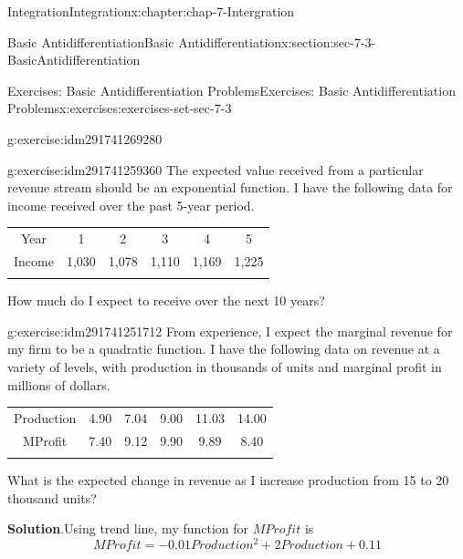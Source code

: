 \documentclass[oneside,10pt,]{book}
\newcommand{\tabularfont}{\relax}
\numberwithin{equation}{section}
\newcommand{\hrulethin}  {\noalign{\hrule height 0.04em}}
\newcommand{\hrulemedium}{\noalign{\hrule height 0.07em}}
\newcommand{\hrulethick} {\noalign{\hrule height 0.11em}}
\begin{document}
\begin{chapterptx}{Integration}{}{Integration}{}{}{x:chapter:chap-7-Intergration}
\begin{sectionptx}{Basic Antidifferentiation}{}{Basic Antidifferentiation}{}{}{x:section:sec-7-3-BasicAntidifferentiation}
\begin{exercises-subsection}{Exercises: Basic Antidifferentiation Problems}{}{Exercises: Basic Antidifferentiation Problems}{}{}{x:exercises:exercises-set-sec-7-3}
\begin{divisionexercise}{21}{}{}{g:exercise:idm291741269280}
\begin{enumerate}[label=(\alph*)]
\end{enumerate}
\end{divisionexercise}%
\begin{divisionexercise}{22}{}{}{g:exercise:idm291741259360}%
The expected value received from a particular revenue stream should be an exponential function.  I have the following data for income received over the past 5-year period.%
\begin{sidebyside}{1}{0}{0}{0}%
\begin{sbspanel}{1}%
{\centering%
{\tabularfont%
\begin{tabular}{cccccc}\hrulethick
Year&1&2&3&4&5\tabularnewline\hrulethin
Income&\textdollar{}1,030&\textdollar{}1,078&\textdollar{}1,110&\textdollar{}1,169&\textdollar{}1,225\tabularnewline\hrulemedium
\end{tabular}
}%
\par}
\end{sbspanel}%
\end{sidebyside}%
\par
How much do I expect to receive over the next 10 years?%
\end{divisionexercise}%
\begin{divisionexercise}{23}{}{}{g:exercise:idm291741251712}%
From experience, I expect the marginal revenue for my firm to be a quadratic function.  I have the following data on revenue at a variety of levels, with production in thousands of units and marginal profit in millions of dollars.%
\begin{sidebyside}{1}{0}{0}{0}%
\begin{sbspanel}{1}%
{\centering%
{\tabularfont%
\begin{tabular}{cccccc}\hrulethick
Production&\textdollar{}4.90&\textdollar{}7.04&9.00&11.03&14.00\tabularnewline\hrulethin
MProfit&7.40&9.12&9.90&9.89&8.40\tabularnewline\hrulemedium
\end{tabular}
}%
\par}
\end{sbspanel}%
\end{sidebyside}%
\par
What is the expected change in revenue as I increase production from 15 to 20 thousand units?%
\par\smallskip%
\noindent\textbf{Solution}.\hypertarget{g:solution:idm291741244112}{}\quad{}Using trend line, my function for \(MProfit\) is%
%
\begin{equation*}
MProfit=-0.01Production^2+2Production+0.11
\end{equation*}

\end{divisionexercise}
\end{exercises-subsection}
\end{sectionptx}
\end{chapterptx}
\end{document}
